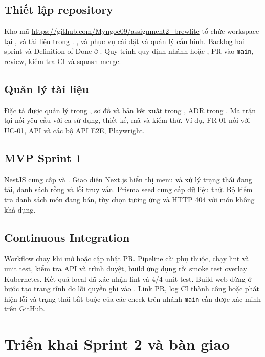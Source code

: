 \documentclass[a4paper]{article}
\begin{document}
\subsection{Thiết lập repository}
Kho mã \url{https://github.com/Myngoc09/assignment2_brewlite} tổ chức workspace tại ,  và tài liệu trong . ,  và  phục vụ cài đặt và quản lý cấu hình. Backlog hai sprint và Definition of Done ở . Quy trình quy định nhánh  hoặc , PR vào \texttt{main}, review, kiểm tra CI và squash merge.

\subsection{Quản lý tài liệu}
Đặc tả được quản lý trong , sơ đồ và bản kết xuất trong , ADR trong . Ma trận tại  nối yêu cầu với ca sử dụng, thiết kế, mã và kiểm thử. Ví dụ, FR-01 nối với UC-01, API  và các bộ API E2E, Playwright.

\subsection{MVP Sprint 1}
NestJS cung cấp  và . Giao diện Next.js hiển thị menu và xử lý trạng thái đang tải, danh sách rỗng và lỗi truy vấn. Prisma seed cung cấp dữ liệu thử. Bộ  kiểm tra danh sách món đang bán, tùy chọn tương ứng và HTTP 404 với món không khả dụng.

\subsection{Continuous Integration}
Workflow  chạy khi mở hoặc cập nhật PR. Pipeline cài phụ thuộc, chạy lint và unit test, kiểm tra API và trình duyệt, build ứng dụng rồi smoke test overlay Kubernetes. Kết quả local đã xác nhận lint và 4/4 unit test. Build web dừng ở bước tạo trang tĩnh do lỗi quyền ghi vào . Link PR, log CI thành công hoặc phát hiện lỗi và trạng thái bắt buộc của các check trên nhánh \texttt{main} cần được xác minh trên GitHub.

\section{Triển khai Sprint 2 và bàn giao}
\end{document}
